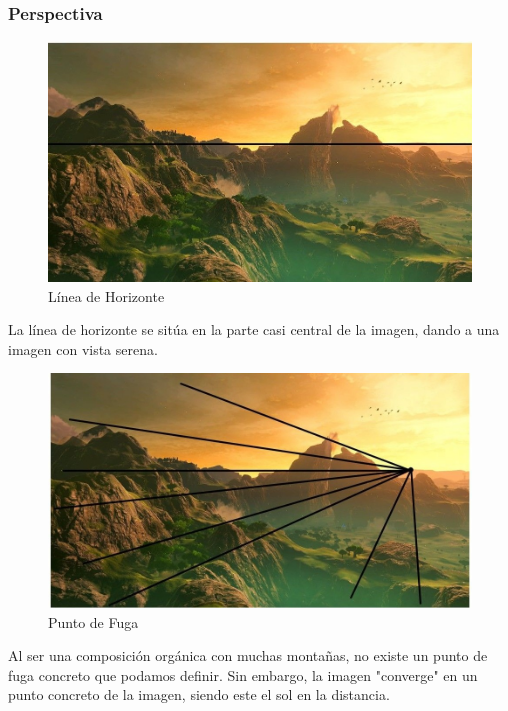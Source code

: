\documentclass[12pt]{article}
\begin{document}
        \subsubsection{Perspectiva}
          \begin{figure}[H]
            \centering
            \includegraphics[width=\textwidth]{Jesus/Seccion16/Fondo4.JPEG}
            \caption{Línea de Horizonte}
          \end{figure}
          La línea de horizonte se sitúa en la parte casi central de la imagen, dando a una imagen con vista serena.

          \begin{figure}[H]
            \centering
            \includegraphics[width=\textwidth]{Jesus/Seccion16/Fondo1.JPEG}
            \caption{Punto de Fuga}
          \end{figure}
          Al ser una composición orgánica con muchas montañas, no existe un punto de fuga concreto que podamos definir. Sin embargo, la imagen "converge" en un punto concreto de la imagen, siendo este el sol en la distancia. 
\end{document}
